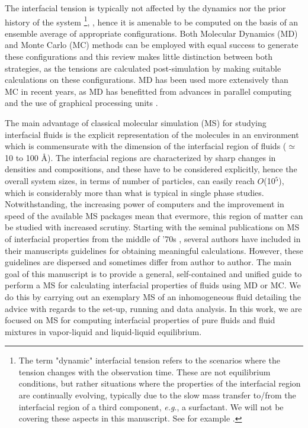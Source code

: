 \documentclass[9pt,tutorial]{livecoms}
\begin{document}
The interfacial tension is typically not affected by the dynamics nor the prior
history of the system \footnote{The term "dynamic" interfacial tension
refers to the scenarios where the tension changes with the observation time.
These are not equilibrium conditions, but rather situations where the
properties of the interfacial region are continually evolving, typically due to
the slow mass transfer to/from the interfacial region of a third component,
\textit{e.g}., a surfactant. We will not be covering these aspects in this
manuscript. See for example \citet{dukhin1995}.}, \citep{rowlinson1982}, hence it is amenable to be computed on
the basis of an ensemble average of appropriate configurations. Both Molecular
Dynamics (MD) \citep{allen2017} and Monte Carlo (MC) \citep{frenkel2002} methods can be employed
with equal success to generate these configurations and this review makes
little distinction between both strategies, as the tensions are calculated
post-simulation by making suitable calculations on these configurations. MD has
been used more extensively than MC in recent years, as MD has benefitted from
advances in parallel computing and the use of graphical processing units \citep{faraday2014}.

The main advantage of classical molecular simulation (MS) for studying
interfacial fluids is the explicit representation of the molecules in an
environment which is commensurate with the dimension of the interfacial region
of fluids (${\simeq}$ 10 to 100 \AA{}). The interfacial regions are
characterized by sharp changes in densities and compositions, and these have to
be considered explicitly, hence the overall system sizes, in terms of number of
particles, can easily reach $O$(10$^{5}$), which is considerably more
than what is typical in single phase studies. Notwithstanding, the increasing
power of computers and the improvement in speed of the available MS packages
mean that evermore, this region of matter can be studied with increased
scrutiny. Starting with the seminal publications on MS of interfacial
properties from the middle of '70s \citep{liu1974}, several
authors have included in their manuscripts guidelines for obtaining meaningful
calculations. However, these guidelines are dispersed and sometimes differ from
author to author. The main goal of this manuscript is to provide a general,
self-contained and unified guide to perform a MS for calculating
interfacial properties of fluids using MD or MC. We do this by carrying out an
exemplary MS of an inhomogeneous fluid detailing the advice with regards to the
set-up, running and data analysis. In this work, we are focused on MS for
computing interfacial properties of pure fluids and fluid mixtures in
vapor-liquid and liquid-liquid equilibrium. 
\end{document}
